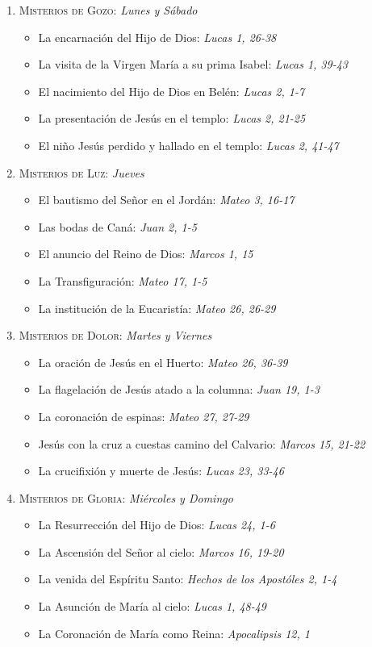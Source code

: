 \documentclass[12pt, letterpaper]{report}
\begin{document}
    \begin{enumerate}
        \item \textsc{Misterios de Gozo}: \textit{Lunes y Sábado}
        \begin{itemize}
         \item La encarnación del Hijo de Dios: \textit{Lucas 1, 26-38}
         \item La visita de la Virgen María a su prima Isabel: \textit{Lucas 1, 39-43}
         \item El nacimiento del Hijo de Dios en Belén: \textit{Lucas 2, 1-7}
         \item La presentación de Jesús en el templo: \textit{Lucas 2, 21-25}
         \item El niño Jesús perdido y hallado en el templo: \textit{Lucas 2, 41-47}
        \end{itemize}
        \item \textsc{Misterios de Luz}: \textit{Jueves}
        \begin{itemize}
         \item El bautismo del Señor en el Jordán: \textit{Mateo 3, 16-17}
         \item Las bodas de Caná: \textit{Juan 2, 1-5}
         \item El anuncio del Reino de Dios: \textit{Marcos 1, 15}
         \item La Transfiguración: \textit{Mateo 17, 1-5}
         \item La institución de la Eucaristía: \textit{Mateo 26, 26-29}
        \end{itemize}
        \item \textsc{Misterios de Dolor}: \textit{Martes y Viernes}
        \begin{itemize}
         \item La oración de Jesús en el Huerto: \textit{Mateo 26, 36-39}
         \item La flagelación de Jesús atado a la columna: \textit{Juan 19, 1-3}
         \item La coronación de espinas: \textit{Mateo 27, 27-29}
         \item Jesús con la cruz a cuestas camino del Calvario: \textit{Marcos 15, 21-22}
         \item La crucifixión y muerte de Jesús: \textit{Lucas 23, 33-46}
        \end{itemize}
        \item \textsc{Misterios de Gloria}: \textit{Miércoles y Domingo}
        \begin{itemize}
         \item La Resurrección del Hijo de Dios: \textit{Lucas 24, 1-6}
         \item La Ascensión del Señor al cielo: \textit{Marcos 16, 19-20}
         \item La venida del Espíritu Santo: \textit{Hechos de los Apostóles 2, 1-4}
         \item La Asunción de María al cielo: \textit{Lucas 1, 48-49}
         \item La Coronación de María como Reina: \textit{Apocalipsis 12, 1}
        \end{itemize}
    \end{enumerate}
        
\end{document}
